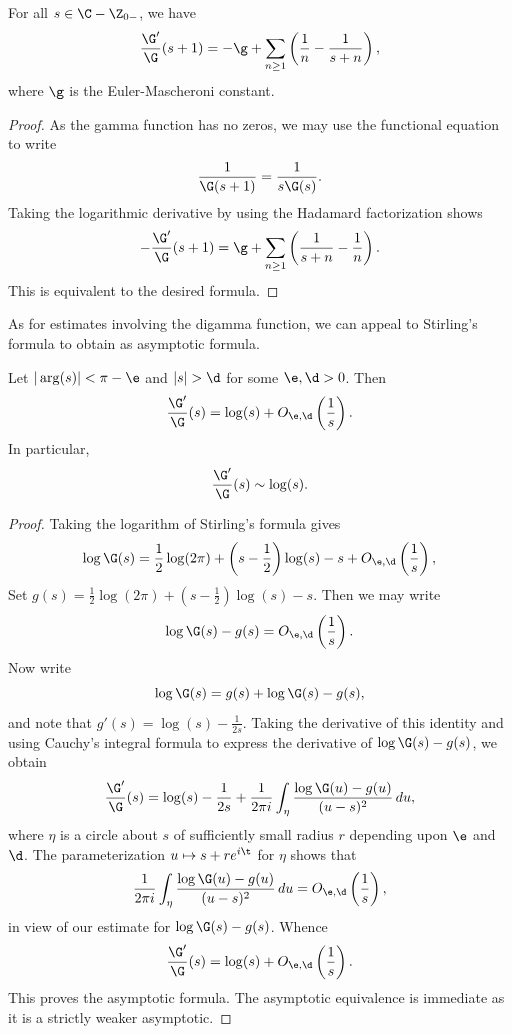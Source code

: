 \documentclass[12pt]{article}
\begin{document}
      \begin{corollary}\label{cor:logarithmic_derivative_of_gamma}
        For all \(s \in \C-\Z_{0-}\), we have
        \[
          \frac{\G'}{\G}(s+1) = -\g+\sum_{n \ge 1}\left(\frac{1}{n}-\frac{1}{s+n}\right),
        \]
        where \(\g\) is the Euler-Mascheroni constant.
      \end{corollary}
      \begin{proof}
        As the gamma function has no zeros, we may use the functional equation to write
        \[
          \frac{1}{\G(s+1)} = \frac{1}{s\G(s)}.
        \]
        Taking the logarithmic derivative by using the Hadamard factorization shows
        \[
          -\frac{\G'}{\G}(s+1) = \g+\sum_{n \ge 1}\left(\frac{1}{s+n}-\frac{1}{n}\right).
        \]
        This is equivalent to the desired formula.
      \end{proof}

      As for estimates involving the digamma function, we can appeal to Stirling's formula to obtain as asymptotic formula.

      \begin{proposition}\label{equ:approximtion_for_digamma}
        Let \(|\arg(s)| < \pi-\e\) and \(|s| > \d\) for some \(\e,\d > 0\). Then
        \[
          \frac{\G'}{\G}(s) = \log(s)+O_{\e,\d}\left(\frac{1}{s}\right).
        \]
        In particular,
        \[
          \frac{\G'}{\G}(s) \sim \log(s).
        \]
      \end{proposition}
      \begin{proof}
        Taking the logarithm of Stirling's formula gives
        \[
          \log\G(s) = \frac{1}{2}\log(2\pi)+\left(s-\frac{1}{2}\right)\log(s)-s+O_{\e,\d}\left(\frac{1}{s}\right),
        \]
        Set \(g(s) = \frac{1}{2}\log(2\pi)+\left(s-\frac{1}{2}\right)\log(s)-s\). Then we may write
        \[
          \log\G(s)-g(s) = O_{\e,\d}\left(\frac{1}{s}\right).
        \]
        Now write
        \[
          \log\G(s) = g(s)+\log\G(s)-g(s),
        \]
        and note that \(g'(s) = \log(s)-\frac{1}{2s}\). Taking the derivative of this identity and using Cauchy's integral formula to express the derivative of \(\log\G(s)-g(s)\), we obtain
        \[
          \frac{\G'}{\G}(s) = \log(s)-\frac{1}{2s}+\frac{1}{2\pi i}\int_{\eta}\frac{\log\G(u)-g(u)}{(u-s)^{2}}\,du,
        \]
        where \(\eta\) is a circle about \(s\) of sufficiently small radius \(r\) depending upon \(\e\) and \(\d\). The parameterization \(u \mapsto s+re^{i\t}\) for \(\eta\) shows that
        \[
          \frac{1}{2\pi i}\int_{\eta}\frac{\log\G(u)-g(u)}{(u-s)^{2}}\,du = O_{\e,\d}\left(\frac{1}{s}\right),
        \]
        in view of our estimate for \(\log\G(s)-g(s)\). Whence
        \[
          \frac{\G'}{\G}(s) = \log(s)+O_{\e,\d}\left(\frac{1}{s}\right).
        \]
        This proves the asymptotic formula. The asymptotic equivalence is immediate as it is a strictly weaker asymptotic.
      \end{proof}
\end{document}

